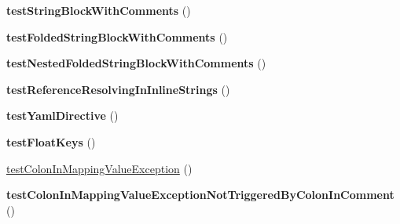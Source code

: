\begin{DoxyCompactItemize}
\item 
{\bfseries test\+String\+Block\+With\+Comments} ()\hypertarget{class_symfony_1_1_component_1_1_yaml_1_1_tests_1_1_parser_test_a1e91cbbf9133f7252fc02c306f5805c0}{}\label{class_symfony_1_1_component_1_1_yaml_1_1_tests_1_1_parser_test_a1e91cbbf9133f7252fc02c306f5805c0}

\item 
{\bfseries test\+Folded\+String\+Block\+With\+Comments} ()\hypertarget{class_symfony_1_1_component_1_1_yaml_1_1_tests_1_1_parser_test_a173a2f7da9395355deec7c67de0bc6c1}{}\label{class_symfony_1_1_component_1_1_yaml_1_1_tests_1_1_parser_test_a173a2f7da9395355deec7c67de0bc6c1}

\item 
{\bfseries test\+Nested\+Folded\+String\+Block\+With\+Comments} ()\hypertarget{class_symfony_1_1_component_1_1_yaml_1_1_tests_1_1_parser_test_a8c093ab07081e9a41168bb80705721f9}{}\label{class_symfony_1_1_component_1_1_yaml_1_1_tests_1_1_parser_test_a8c093ab07081e9a41168bb80705721f9}

\item 
{\bfseries test\+Reference\+Resolving\+In\+Inline\+Strings} ()\hypertarget{class_symfony_1_1_component_1_1_yaml_1_1_tests_1_1_parser_test_a19d50c6e12b39d84a9df0fe8393b1864}{}\label{class_symfony_1_1_component_1_1_yaml_1_1_tests_1_1_parser_test_a19d50c6e12b39d84a9df0fe8393b1864}

\item 
{\bfseries test\+Yaml\+Directive} ()\hypertarget{class_symfony_1_1_component_1_1_yaml_1_1_tests_1_1_parser_test_a58b82fb07e01f77ef5cc363d2b39af17}{}\label{class_symfony_1_1_component_1_1_yaml_1_1_tests_1_1_parser_test_a58b82fb07e01f77ef5cc363d2b39af17}

\item 
{\bfseries test\+Float\+Keys} ()\hypertarget{class_symfony_1_1_component_1_1_yaml_1_1_tests_1_1_parser_test_a83e8f7ed0fa69d629c01bc6bbb9dda8b}{}\label{class_symfony_1_1_component_1_1_yaml_1_1_tests_1_1_parser_test_a83e8f7ed0fa69d629c01bc6bbb9dda8b}

\item 
\hyperlink{class_symfony_1_1_component_1_1_yaml_1_1_tests_1_1_parser_test_a1f230fdefeb6f19e608839cce77c559c}{test\+Colon\+In\+Mapping\+Value\+Exception} ()
\item 
{\bfseries test\+Colon\+In\+Mapping\+Value\+Exception\+Not\+Triggered\+By\+Colon\+In\+Comment} ()\hypertarget{class_symfony_1_1_component_1_1_yaml_1_1_tests_1_1_parser_test_a21f36c4a9b6d2e9e66b38949ee55e035}{}\label{class_symfony_1_1_component_1_1_yaml_1_1_tests_1_1_parser_test_a21f36c4a9b6d2e9e66b38949ee55e035}


\end{DoxyCompactItemize}
